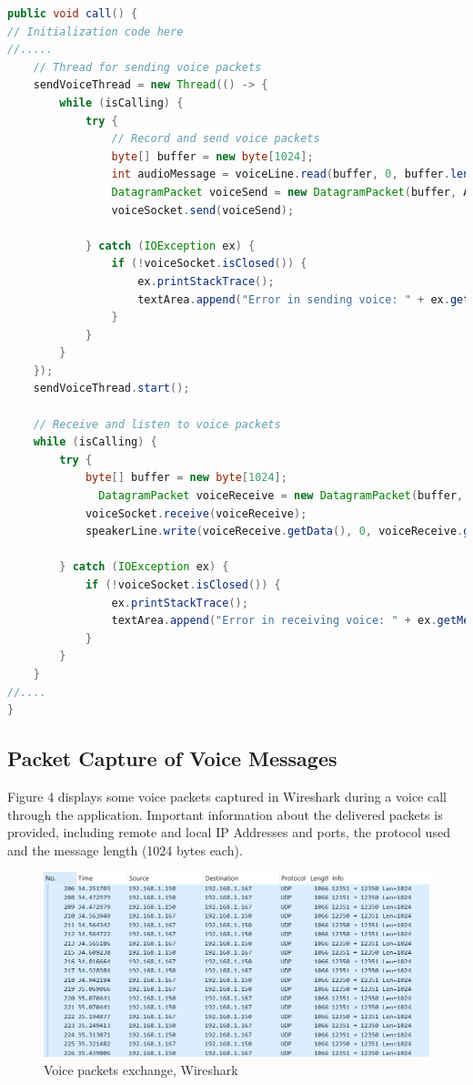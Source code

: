 \documentclass{article}
\begin{document}
\begin{lstlisting}[language=Java, caption={Voice call function}]
public void call() {
// Initialization code here
//.....
    // Thread for sending voice packets
    sendVoiceThread = new Thread(() -> {
        while (isCalling) {
            try {
                // Record and send voice packets
                byte[] buffer = new byte[1024];
                int audioMessage = voiceLine.read(buffer, 0, buffer.length);
                DatagramPacket voiceSend = new DatagramPacket(buffer, AudioMessage, remoteAddress, voiceRemotePort);
                voiceSocket.send(voiceSend);

            } catch (IOException ex) {
                if (!voiceSocket.isClosed()) {
                    ex.printStackTrace();
                    textArea.append("Error in sending voice: " + ex.getMessage() + "\n");
                }
            }
        }
    });
    sendVoiceThread.start();

    // Receive and listen to voice packets
    while (isCalling) {
        try {
            byte[] buffer = new byte[1024];
	          DatagramPacket voiceReceive = new DatagramPacket(buffer, buffer.length);
            voiceSocket.receive(voiceReceive);
            speakerLine.write(voiceReceive.getData(), 0, voiceReceive.getLength());
            
        } catch (IOException ex) {
            if (!voiceSocket.isClosed()) {
                ex.printStackTrace();
                textArea.append("Error in receiving voice: " + ex.getMessage() + "\n");
            }
        }
    }
//....
}
\end{lstlisting}

\subsection{Packet Capture of Voice Messages}
Figure 4 displays some voice packets captured in Wireshark during a voice call through the application. Important information about the delivered packets is provided, including remote and local IP Addresses and ports, the protocol used and the message length (1024 bytes each).
\newline

\begin{figure}[h!]
    \centering
    \includegraphics[width=1\linewidth]{image4.png}
    \caption{Voice packets exchange, Wireshark}
    \label{fig:enter-label}
\end{figure}
\end{document}
